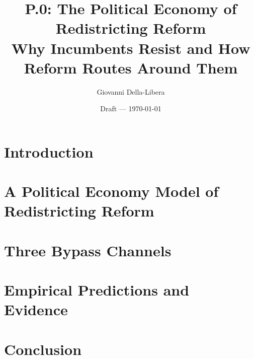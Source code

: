 \documentclass[12pt]{article}
\title{P.0: The Political Economy of Redistricting Reform\\
       \large Why Incumbents Resist and How Reform Routes Around Them}
\author{Giovanni Della-Libera}
\date{Draft --- \today}
\begin{document}
\maketitle

\begin{abstract}

\end{abstract}

\newpage
\tableofcontents
\newpage

\section{Introduction}


\section{A Political Economy Model of Redistricting Reform}


\section{Three Bypass Channels}


\section{Empirical Predictions and Evidence}


\section{Conclusion}




\end{document}
